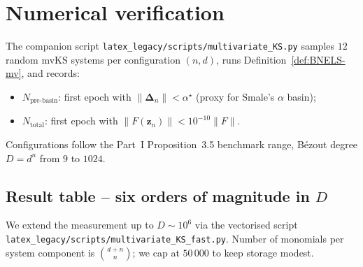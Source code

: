 \documentclass[11pt,a4paper]{article}
\begin{document}
\section{Numerical verification}\label{sec:numerics}

The companion script \verb|latex_legacy/scripts/multivariate_KS.py| samples $12$ random mvKS systems per configuration $(n, d)$, runs Definition~\ref{def:BNELS-mv}, and records:
\begin{itemize}
\item $N_{\text{pre-basin}}$: first epoch with $\|\boldsymbol{\Delta}_n\| < \alpha^\star$ (proxy for Smale's $\alpha$ basin);
\item $N_{\text{total}}$: first epoch with $\|F(\mathbf z_n)\| < 10^{-10}\|F\|$.
\end{itemize}
Configurations follow the Part~I Proposition~3.5 benchmark range, B\'ezout degree $D = d^n$ from $9$ to $1024$.

\subsection{Result table -- six orders of magnitude in $D$}

We extend the measurement up to $D \sim 10^6$ via the vectorised script \verb|latex_legacy/scripts/multivariate_KS_fast.py|. Number of monomials per system component is $\binom{d+n}{n}$; we cap at $50\,000$ to keep storage modest.
\end{document}
